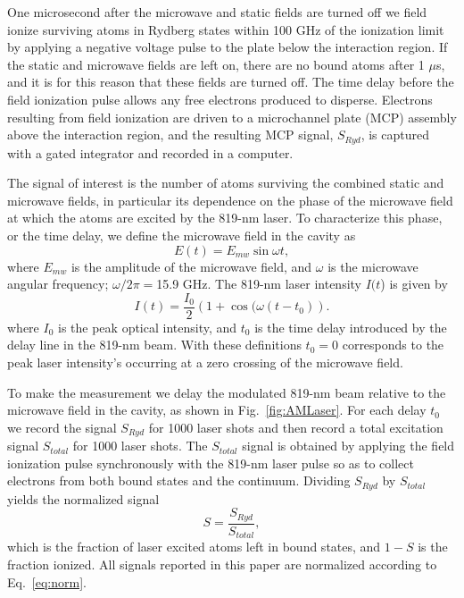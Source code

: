 \documentclass[aps,pra,reprint,groupedaddress]{revtex4-1}
\begin{document}
One microsecond after the microwave and static fields are turned off we field ionize surviving atoms in Rydberg states within 100 GHz of the ionization limit by applying a negative voltage pulse to the plate below the interaction region. If the static and microwave fields are left on, there are no bound atoms after 1 $\mu$s, and it is for this reason that these fields are turned off. The time delay before the field ionization pulse allows any free electrons produced to disperse. Electrons resulting from field ionization are driven to a microchannel plate (MCP) assembly above the interaction region, and the resulting MCP signal, $S_{Ryd}$, is captured with a gated integrator and recorded in a computer.

The signal of interest is the number of atoms surviving the combined static and microwave fields, in particular its dependence on the phase of the microwave field at which the atoms are excited by the 819-nm laser.
To characterize this phase, or the time delay, we define the microwave field in the cavity as
\begin{equation}
E(t) =E_{mw}\sin{\omega t},
\end{equation}
where $E_{mw}$ is the amplitude of the microwave field, and $\omega$ is the microwave angular frequency; $\omega/2\pi=$15.9 GHz. The 819-nm laser intensity $I(t$) is given by
\begin{equation} \label{eq:AMLaser}
I(t) =\frac{I_0}{2}(1+\cos{(\omega (t-t_0)}).
\end{equation}
where $I_0$ is the peak optical intensity, and $t_0$ is the time delay introduced by the delay line in the 819-nm beam. With these definitions $t_0=0$ corresponds to the peak laser intensity's occurring at a zero crossing of the microwave field.

To make the measurement we delay the modulated 819-nm beam relative to the microwave field in the cavity, as shown in Fig.~\ref{fig:AMLaser}. For each delay $t_0$ we record the signal $S_{Ryd}$ for 1000 laser shots and then record a total excitation signal $S_{total}$ for 1000 laser shots. The $S_{total}$ signal is obtained by applying the field ionization pulse synchronously with the 819-nm laser pulse so as to collect electrons from both bound states and the continuum. Dividing $S_{Ryd}$ by $S_{total}$ yields the normalized signal
\begin{equation} \label{eq:norm}
S=\frac{S_{Ryd}}{S_{total}},
\end{equation}
which is the fraction of laser excited atoms left in bound states, and $1-S$ is the fraction ionized. All signals reported in this paper are normalized according to Eq.~\ref{eq:norm}.
\end{document}
